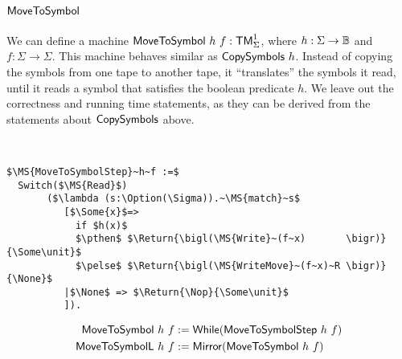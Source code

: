 \section{$\MS{MoveToSymbol}$}
\label{sec:MoveToSymbol}

We can define a machine $\mathsf{MoveToSymbol}~h~f : \mathsf{TM}_\Sigma^1$, where $h:\Sigma\rightarrow\mathbb{B}$ and $f:\Sigma\to\Sigma$.  This machine behaves similar as
$\mathsf{CopySymbols}~h$.  Instead of copying the symbols from one tape to another tape, it ``translates'' the symbols it read, until it reads a symbol
that satisfies the boolean predicate $h$.  We leave out the correctness and running time statements, as they can be derived from the statements about
$\mathsf{CopySymbols}$ above.

\begin{definition}[$\MS{MoveToSymbol}$][MoveToSymbol]
  ~
\begin{lstlisting}[style=semicoqstyle]
$\MS{MoveToSymbolStep}~h~f :=$
  Switch($\MS{Read}$)
       ($\lambda (s:\Option(\Sigma)).~\MS{match}~s$
          [$\Some{x}$=> 
            if $h(x)$
            $\pthen$ $\Return{\bigl(\MS{Write}~(f~x)       \bigr)}{\Some\unit}$ 
            $\pelse$ $\Return{\bigl(\MS{WriteMove}~(f~x)~R \bigr)}{\None}$ 
          |$\None$ => $\Return{\Nop}{\Some\unit}$ 
          ]).
\end{lstlisting}
  \begin{align*}
    \mathsf{MoveToSymbol }~h~f &:= \mathsf{While}(\mathsf{MoveToSymbolStep}~h~f) \\
    \mathsf{MoveToSymbolL}~h~f &:= \mathsf{Mirror}(\mathsf{MoveToSymbol}~h~f)
  \end{align*}
\end{definition}



